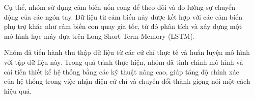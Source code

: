 \documentclass[a4paper]{article}
\begin{document}
\indent Cụ thể, nhóm sử dụng cảm biến uốn cong để theo dõi và đo lường sự chuyển động của các ngón tay. Dữ liệu từ cảm biến này được kết hợp với các cảm biến phụ trợ khác như cảm biến con quay gia tốc, từ đó phân tích và xây dựng một mô hình học máy dựa trên Long Short Term Memory (LSTM).

\indent Nhóm đã tiến hành thu thập dữ liệu từ các cử chỉ thực tế và huấn luyện mô hình với tập dữ liệu này. Trong quá trình thực hiện, nhóm đã tinh chỉnh mô hình và cải tiến thiết kế hệ thống bằng các kỹ thuật nâng cao, giúp tăng độ chính xác của hệ thống trong việc nhận diện cử chỉ và chuyển đổi thành giọng nói một cách hiệu quả.


\newpage
\renewcommand*\contentsname{Mục lục}
\tableofcontents







\newpage

\newpage
\newpage
\fancyfoot{} %
\setcounter{page}{1}

\newpage\newpage

\newpage

\newpage

\newpage

\newpage

\newpage

\newpage

\end{document}
